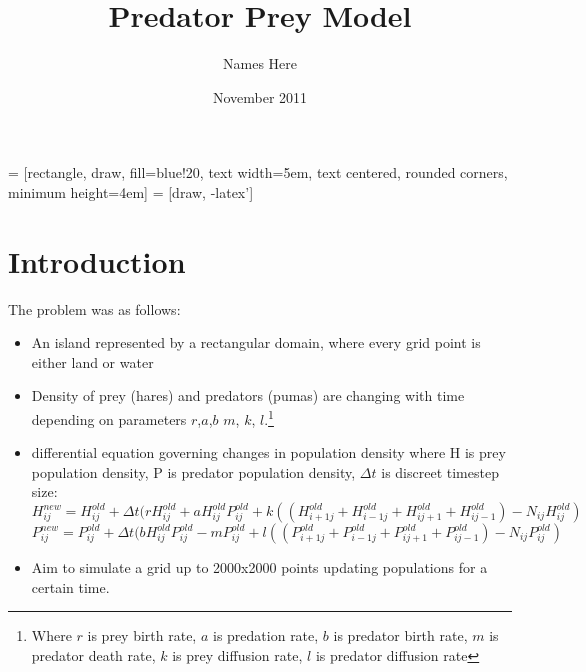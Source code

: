 \documentclass[11pt]{report}
\title{Predator Prey Model}
\author{Names Here}
\date{November 2011}
\begin{document}
\usetikzlibrary{shapes,arrows}


 = [rectangle, draw, fill=blue!20, 
    text width=5em, text centered, rounded corners, minimum height=4em]
 = [draw, -latex']

\maketitle

\begin{abstract}
\end{abstract}

\tableofcontents

\chapter{Introduction}

The problem was as follows:
\begin{itemize}
\item An island represented by a rectangular domain, where every grid point is either land or water
\item Density of prey (hares) and predators (pumas) are changing with time depending on parameters $r$,$a$,$b$ $m$, $k$, $l$.\footnote{Where $r$ is prey birth rate, $a$ is predation rate, $b$ is predator birth rate, $m$ is predator death rate, $k$ is prey diffusion rate, $l$ is predator diffusion rate}
\item differential equation governing changes in population density where H is prey population density, P is predator population density, ${\Delta}t$ is discreet timestep size:
\begin{equation*}
H_{ij}^{new}=H_{ij}^{old} + {\Delta}t(rH_{ij}^{old}+aH_{ij}^{old}P_{ij}^{old} + k((H_{i+1j}^{old} + H_{i-1j}^{old} + H_{ij+1}^{old} + H_{ij-1}^{old})-N_{ij}H_{ij}^{old})
\end{equation*}
\begin{equation*}
P_{ij}^{new}=P_{ij}^{old} + {\Delta}t(bH_{ij}^{old}P_{ij}^{old}-mP_{ij}^{old} + l((P_{i+1j}^{old} + P_{i-1j}^{old} + P_{ij+1}^{old} + P_{ij-1}^{old})-N_{ij}P_{ij}^{old})
\end{equation*}

\item Aim to simulate a grid up to 2000x2000 points updating populations for a certain time.
\end{itemize}
\end{document}
